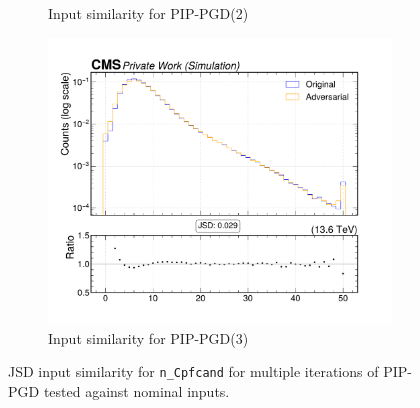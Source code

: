 \begin{figure}[htbp]
\begin{subfigure}[t]{0.32\textwidth}
    \caption*{Input similarity for PIP-PGD(2)}
  \end{subfigure}\hfill
  \begin{subfigure}[t]{0.32\textwidth}
    \includegraphics[width=\linewidth]{media/output/features/compare/combined_it_3/cmp_global_features_n_Cpfcand.pdf}
    \caption*{Input similarity for PIP-PGD(3)}
  \end{subfigure}

  \caption*{JSD input similarity for \texttt{n\_Cpfcand} for multiple iterations of PIP-PGD tested against nominal inputs.}
  \label{fig:combined_input_n_Cpfcand}
\end{figure}

